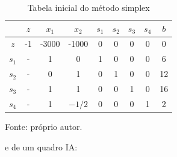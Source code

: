         \begin{table}[H]
            \centering
            \caption{Tabela inicial do método simplex}
            \begin{tabular}{|c|c|c|c|c|c|c|c|c|}
                \hline
                        & $z$   & $x_1$ & $x_2$ & $s_1$ & $s_2$ & $s_3$ & $s_4$ & $b$   \\ \hline
                $z$     & -1    & -3000 & -1000 & 0     & 0     & 0     & 0     & 0     \\ \hline
                $s_1$   & -     & 1     & 0     & 1     & 0     & 0     & 0     & 6     \\ \hline
                $s_2$   & -     & 0     & 1     & 0     & 1     & 0     & 0     & 12    \\ \hline
                $s_3$   & -     & 1     & 1     & 0     & 0     & 1     & 0     & 16    \\ \hline
                $s_4$   & -     & 1     & $-1/2$& 0     & 0     & 0     & 1     & 2     \\ \hline
            \end{tabular}
            \par \footnotesize Fonte: próprio autor.
            \label{tab:5_4-tabela_inicial}
        \end{table}
    
        e de um quadro \acrshort{IA}:

